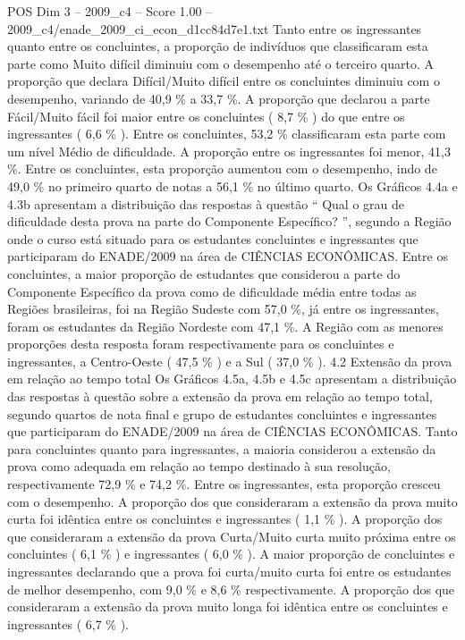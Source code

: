 \begin{textsample}{POS Dim 3 – 2009\_c4 – Score 1.00 – 2009\_c4/enade\_2009\_ci\_econ\_d1cc84d7e1.txt}
Tanto entre os ingressantes quanto entre os concluintes, a proporção de indivíduos que classificaram esta parte como Muito difícil diminuiu com o desempenho até o terceiro quarto.
A proporção que declara Difícil/Muito difícil entre os concluintes diminuiu com o desempenho, variando de 40,9 \% a 33,7 \%.
A proporção que declarou a parte Fácil/Muito fácil foi maior entre os concluintes ( 8,7 \% ) do que entre os ingressantes ( 6,6 \% ).
Entre os concluintes, 53,2 \% classificaram esta parte com um nível Médio de dificuldade.
A proporção entre os ingressantes foi menor, 41,3 \%.
Entre os concluintes, esta proporção aumentou com o desempenho, indo de 49,0 \% no primeiro quarto de notas a 56,1 \% no último quarto.
Os Gráficos 4.4a e 4.3b apresentam a distribuição das respostas à questão “ Qual o grau de dificuldade desta prova na parte do Componente Específico? ”, segundo a Região onde o curso está situado para os estudantes concluintes e ingressantes que participaram do ENADE/2009 na área de CIÊNCIAS ECONÔMICAS.
Entre os concluintes, a maior proporção de estudantes que considerou a parte do Componente Específico da prova como de dificuldade média entre todas as Regiões brasileiras, foi na Região Sudeste com 57,0 \%, já entre os ingressantes, foram os estudantes da Região Nordeste com 47,1 \%.
A Região com as menores proporções desta resposta foram respectivamente para os concluintes e ingressantes, a Centro-Oeste ( 47,5 \% ) e a Sul ( 37,0 \% ). 4.2 Extensão da prova em relação ao tempo total Os Gráficos 4.5a, 4.5b e 4.5c apresentam a distribuição das respostas à questão sobre a extensão da prova em relação ao tempo total, segundo quartos de nota final e grupo de estudantes concluintes e ingressantes que participaram do ENADE/2009 na área de CIÊNCIAS ECONÔMICAS.
Tanto para concluintes quanto para ingressantes, a maioria considerou a extensão da prova como adequada em relação ao tempo destinado à sua resolução, respectivamente 72,9 \% e 74,2 \%.
Entre os ingressantes, esta proporção cresceu com o desempenho.
A proporção dos que consideraram a extensão da prova muito curta foi idêntica entre os concluintes e ingressantes ( 1,1 \% ).
A proporção dos que consideraram a extensão da prova Curta/Muito curta muito próxima entre os concluintes ( 6,1 \% ) e ingressantes ( 6,0 \% ).
A maior proporção de concluintes e ingressantes declarando que a prova foi curta/muito curta foi entre os estudantes de melhor desempenho, com 9,0 \% e 8,6 \% respectivamente.
A proporção dos que consideraram a extensão da prova muito longa foi idêntica entre os concluintes e ingressantes ( 6,7 \% ).

\end{textsample}
